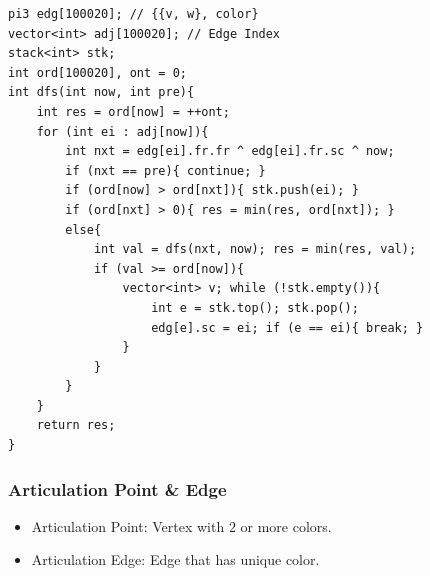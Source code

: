 \begin{verbatim}
pi3 edg[100020]; // {{v, w}, color}
vector<int> adj[100020]; // Edge Index
stack<int> stk;
int ord[100020], ont = 0;
int dfs(int now, int pre){
	int res = ord[now] = ++ont;
	for (int ei : adj[now]){
		int nxt = edg[ei].fr.fr ^ edg[ei].fr.sc ^ now;
		if (nxt == pre){ continue; }
		if (ord[now] > ord[nxt]){ stk.push(ei); }
		if (ord[nxt] > 0){ res = min(res, ord[nxt]); }
		else{
			int val = dfs(nxt, now); res = min(res, val);
			if (val >= ord[now]){
				vector<int> v; while (!stk.empty()){
					int e = stk.top(); stk.pop();
					edg[e].sc = ei; if (e == ei){ break; }
				}
			}
		}
	}
	return res;
}
\end{verbatim}

\subsubsection*{Articulation Point \& Edge}
\begin{itemize}
	\item Articulation Point: Vertex with $2$ or more colors.
	\item Articulation Edge: Edge that has unique color.
\end{itemize}